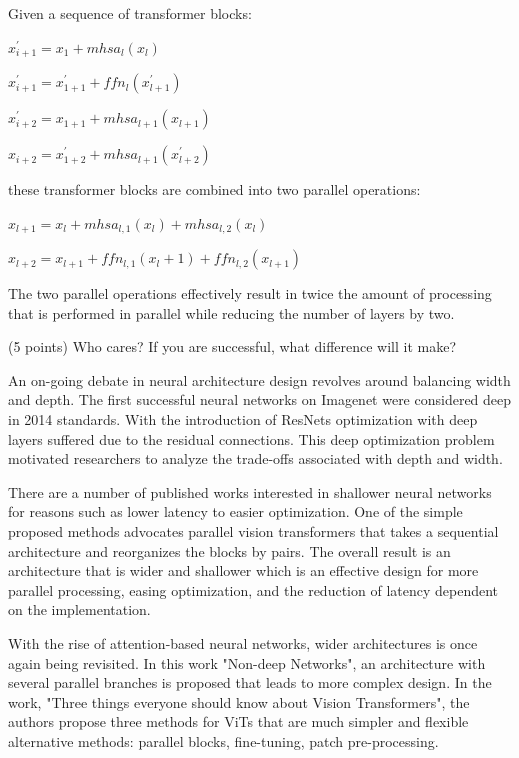 \documentclass[10pt,twocolumn,letterpaper]{article}
\begin{document}
Given a sequence of transformer blocks:

$x^{'}_{i+1} = x_1 + mhsa_l(x_l)$

$x^{'}_{i+1} = x^{'}_{1+1} + ffn_l(x^{'}_{l+1})$

$x^{'}_{i+2} = x_{1+1} + mhsa_{l+1}(x_{l+1})$

$x_{i+2} = x^{'}_{1+2} + mhsa_{l+1}(x^{'}_{l+2})$


these transformer blocks are combined into two parallel operations:

$x_{l+1} = x_{l} + mhsa_{l,1}(x_l) + mhsa_{l,2}(x_l)$

$x_{l+2} = x_{l+1} + ffn_{l,1}(x_l+1) + ffn_{l,2}(x_{l+1})$

The two parallel operations effectively result in twice the amount of processing that is performed in parallel while reducing the number of layers by two.

(5 points) Who cares? If you are successful, what difference will it make? 

An on-going debate in neural architecture design revolves around balancing width and depth. The first successful neural networks on Imagenet were considered deep in 2014 standards\cite{krizhevsky2012imagenet}\cite{simonyan2014very}. With the introduction of ResNets\cite{he2016deep}\cite{he2016identity} optimization with deep layers suffered due to the residual connections. This deep optimization problem motivated researchers to analyze the trade-offs associated with depth and width\cite{ding2021repvgg}\cite{huang2016deep}\cite{zagoruyko2016wide}. 

There are a number of published works interested in shallower neural networks\cite{goyal2021non}\cite{zagoruyko2016wide} for reasons such as lower latency to easier optimization. One of the simple proposed methods advocates parallel vision transformers\cite{touvron2022three} that takes a sequential architecture and reorganizes the blocks by pairs. The overall result is an architecture that is wider and shallower which is an effective design for more parallel processing, easing optimization, and the reduction of latency dependent on the implementation.

With the rise of attention-based neural networks, wider architectures is once again being revisited\cite{goyal2021non}. In this work "Non-deep Networks", an architecture with several parallel branches is proposed that leads to more complex design. In the work, "Three things everyone should know about Vision Transformers", the authors propose three methods for ViTs that are much simpler and flexible alternative methods: parallel blocks, fine-tuning, patch pre-processing\cite{touvron2022three}. 
\end{document}
